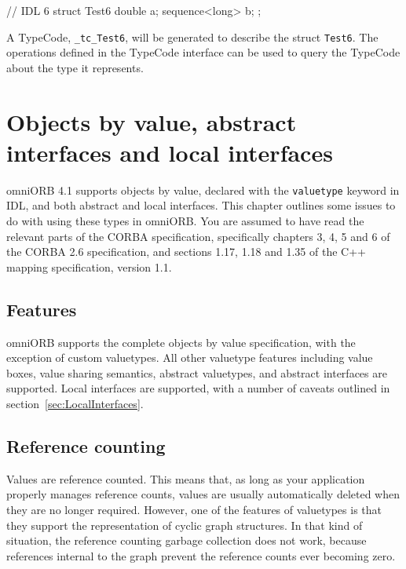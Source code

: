 \documentclass[11pt,oneside,a4paper]{book}
\newcommand{\type}[1]{\texttt{#1}}
\newcommand{\code}[1]{\texttt{#1}}
\begin{document}
\begin{idllisting}
// IDL 6
struct Test6 {
  double a;
  sequence<long> b;
};
\end{idllisting}

A TypeCode, \code{\_tc\_Test6}, will be generated to describe the
struct \type{Test6}. The operations defined in the TypeCode interface
can be used to query the TypeCode about the type it represents.


\chapter[Objects by value, etc.]
  {Objects by value, abstract interfaces and local interfaces}
\label{chap:valuetype}

omniORB 4.1 supports objects by value, declared with the
\code{valuetype} keyword in IDL, and both abstract and local
interfaces. This chapter outlines some issues to do with using these
types in omniORB. You are assumed to have read the relevant parts of
the CORBA specification, specifically chapters 3, 4, 5 and 6 of the
CORBA 2.6 specification, and sections 1.17, 1.18 and 1.35 of the C++
mapping specification, version 1.1.


\section{Features}

omniORB supports the complete objects by value specification, with the
exception of custom valuetypes. All other valuetype features including
value boxes, value sharing semantics, abstract valuetypes, and
abstract interfaces are supported. Local interfaces are supported,
with a number of caveats outlined in
section~\ref{sec:LocalInterfaces}.


\section{Reference counting}

Values are reference counted. This means that, as long as your
application properly manages reference counts, values are usually
automatically deleted when they are no longer required. However, one
of the features of valuetypes is that they support the representation
of cyclic graph structures. In that kind of situation, the reference
counting garbage collection does not work, because references internal
to the graph prevent the reference counts ever becoming zero.
\end{document}

